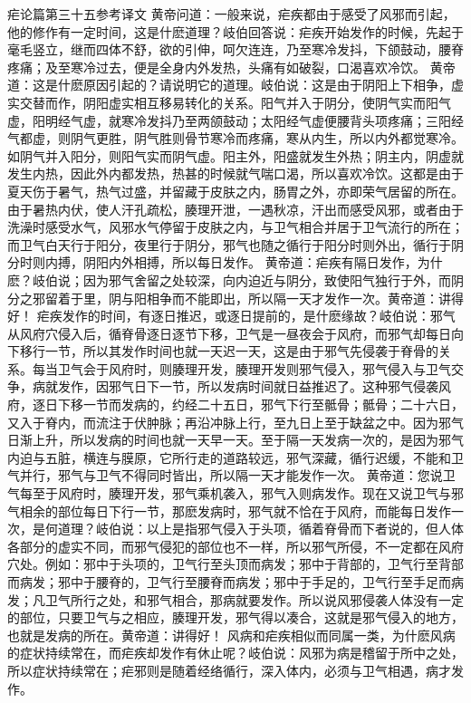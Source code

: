 \documentclass[12pt,UTF8]{ctexbook}
\begin{document}
疟论篇第三十五参考译文
黄帝问道：一般来说，疟疾都由于感受了风邪而引起，他的修作有一定时间，这是什麽道理？岐伯回答说：疟疾开始发作的时候，先起于毫毛竖立，继而四体不舒，欲的引伸，呵欠连连，乃至寒冷发抖，下颌鼓动，腰脊疼痛；及至寒冷过去，便是全身内外发热，头痛有如破裂，口渴喜欢冷饮。
黄帝道：这是什麽原因引起的？请说明它的道理。岐伯说：这是由于阴阳上下相争，虚实交替而作，阴阳虚实相互移易转化的关系。阳气并入于阴分，使阴气实而阳气虚，阳明经气虚，就寒冷发抖乃至两颌鼓动；太阳经气虚便腰背头项疼痛；三阳经气都虚，则阴气更胜，阴气胜则骨节寒冷而疼痛，寒从内生，所以内外都觉寒冷。如阴气并入阳分，则阳气实而阴气虚。阳主外，阳盛就发生外热；阴主内，阴虚就发生内热，因此外内都发热，热甚的时候就气喘口渴，所以喜欢冷饮。这都是由于夏天伤于暑气，热气过盛，并留藏于皮肤之内，肠胃之外，亦即荣气居留的所在。由于暑热内伏，使人汗孔疏松，腠理开泄，一遇秋凉，汗出而感受风邪，或者由于洗澡时感受水气，风邪水气停留于皮肤之内，与卫气相合并居于卫气流行的所在；而卫气白天行于阳分，夜里行于阴分，邪气也随之循行于阳分时则外出，循行于阴分时则内搏，阴阳内外相搏，所以每日发作。
黄帝道：疟疾有隔日发作，为什麽？岐伯说；因为邪气舍留之处较深，向内迫近与阴分，致使阳气独行于外，而阴分之邪留着于里，阴与阳相争而不能即出，所以隔一天才发作一次。黄帝道：讲得好！
疟疾发作的时间，有逐日推迟，或逐日提前的，是什麽缘故？岐伯说：邪气从风府穴侵入后，循脊骨逐日逐节下移，卫气是一昼夜会于风府，而邪气却每日向下移行一节，所以其发作时间也就一天迟一天，这是由于邪气先侵袭于脊骨的关系。每当卫气会于风府时，则腠理开发，腠理开发则邪气侵入，邪气侵入与卫气交争，病就发作，因邪气日下一节，所以发病时间就日益推迟了。这种邪气侵袭风府，逐日下移一节而发病的，约经二十五日，邪气下行至骶骨；骶骨；二十六日，又入于脊内，而流注于伏肿脉；再沿冲脉上行，至九日上至于缺盆之中。因为邪气日渐上升，所以发病的时间也就一天早一天。至于隔一天发病一次的，是因为邪气内迫与五脏，横连与膜原，它所行走的道路较远，邪气深藏，循行迟缓，不能和卫气并行，邪气与卫气不得同时皆出，所以隔一天才能发作一次。
黄帝道：您说卫气每至于风府时，腠理开发，邪气乘机袭入，邪气入则病发作。现在又说卫气与邪气相余的部位每日下行一节，那麽发病时，邪气就不恰在于风府，而能每日发作一次，是何道理？岐伯说：以上是指邪气侵入于头项，循着脊骨而下者说的，但人体各部分的虚实不同，而邪气侵犯的部位也不一样，所以邪气所侵，不一定都在风府穴处。例如：邪中于头项的，卫气行至头顶而病发；邪中于背部的，卫气行至背部而病发；邪中于腰脊的，卫气行至腰脊而病发；邪中于手足的，卫气行至手足而病发；凡卫气所行之处，和邪气相合，那病就要发作。所以说风邪侵袭人体没有一定的部位，只要卫气与之相应，腠理开发，邪气得以凑合，这就是邪气侵入的地方，也就是发病的所在。黄帝道：讲得好！
风病和疟疾相似而同属一类，为什麽风病的症状持续常在，而疟疾却发作有休止呢？岐伯说：风邪为病是稽留于所中之处，所以症状持续常在；疟邪则是随着经络循行，深入体内，必须与卫气相遇，病才发作。
\end{document}
